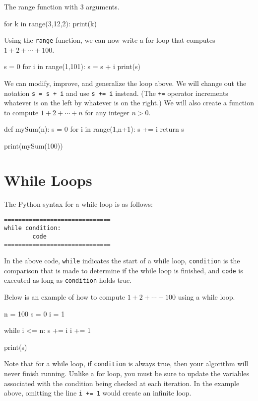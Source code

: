 \documentclass{ximera}
\begin{document}
The range function with 3 arguments.
\begin{sageCell}
for k in range(3,12,2):
     print(k)
\end{sageCell}

Using the \verb|range| function, we can now write a for loop that computes $1+2+\cdots+100$.

\begin{sageCell}
s = 0
for i in range(1,101):
        s = s + i
print(s)
\end{sageCell}

We can modify, improve, and generalize the loop above. We will change out the notation \verb|s = s + i| and use \verb|s += i| instead. (The \verb|+=| operator increments whatever is on the left by whatever is on the right.) We will also create a function to compute $1+2+\cdots+n$ for any integer $n>0$.

\begin{sageCell}
def mySum(n):
        s = 0
        for i in range(1,n+1):
                s += i
        return s

print(mySum(100))
\end{sageCell}

\section{While Loops}

The Python syntax for a while loop is as follows:

\begin{verbatim}
==============================
while condition:
        code
==============================
\end{verbatim}

In the above code, \verb|while| indicates the start of a while loop, \verb|condition| is the comparison that is made to determine if the while loop is finished, and \verb|code| is executed as long as \verb|condition| holds true.

Below is an example of how to compute $1+2+\cdots+100$ using a while loop.

\begin{sageCell}
n = 100
s = 0
i = 1

while i <= n:
        s += i
        i += 1

print(s)
\end{sageCell}

Note that for a while loop, if \verb|condition| is always true, then your algorithm will never finish running. Unlike a for loop, you must be sure to update the variables associated with the condition being checked at each iteration. In the example above, omitting the line \verb|i += 1| would create an infinite loop.
\end{document}
